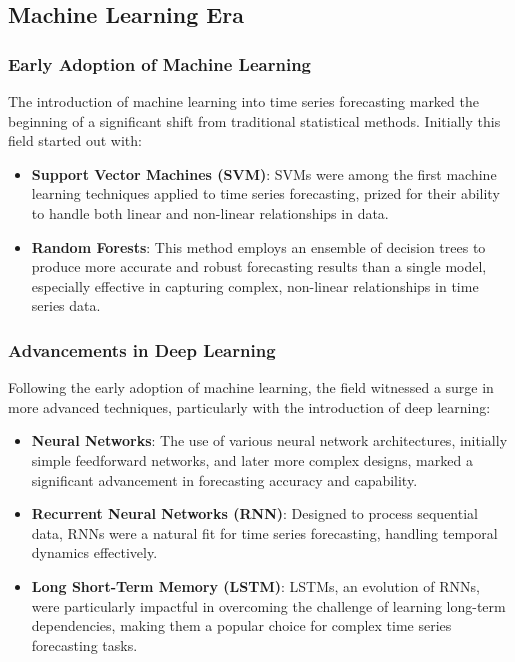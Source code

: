 \subsection{Machine Learning Era}
\subsubsection{Early Adoption of Machine Learning}
The introduction of machine learning into time series forecasting marked the beginning of a significant shift from traditional statistical methods. Initially this field started out with:

\begin{itemize}
    \item \textbf{Support Vector Machines (SVM)}: SVMs were among the first machine learning techniques applied to time series forecasting, prized for their ability to handle both linear and non-linear relationships in data.
    \item \textbf{Random Forests}: This method employs an ensemble of decision trees to produce more accurate and robust forecasting results than a single model, especially effective in capturing complex, non-linear relationships in time series data.
\end{itemize}

\subsubsection{Advancements in Deep Learning}
Following the early adoption of machine learning, the field witnessed a surge in more advanced techniques, particularly with the introduction of deep learning:

\begin{itemize}
    \item \textbf{Neural Networks}: The use of various neural network architectures, initially simple feedforward networks, and later more complex designs, marked a significant advancement in forecasting accuracy and capability.
    \item \textbf{Recurrent Neural Networks (RNN)}: Designed to process sequential data, RNNs were a natural fit for time series forecasting, handling temporal dynamics effectively.
    \item \textbf{Long Short-Term Memory (LSTM)}: LSTMs, an evolution of RNNs, were particularly impactful in overcoming the challenge of learning long-term dependencies, making them a popular choice for complex time series forecasting tasks.
\end{itemize}


